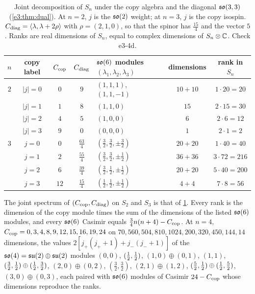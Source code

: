 \begin{table}[t]
\centering
\footnotesize
\begin{tabular}{@{}cccclcc@{}}
\toprule
$n$ & copy label & $C_{\rm cop}$ & $C_{\rm diag}$ & $\mathfrak{so}(6)$ modules $(\lambda_1,\lambda_2,\lambda_3)$ & dimensions & rank in $S_n$\\
\midrule
$2$ & $|j|=0$ & $0$ & $9$ & $(1,1,1)$, $(1,1,-1)$ & $10+10$ & $1\cdot20=20$\\
 & $|j|=1$ & $1$ & $8$ & $(1,1,0)$ & $15$ & $2\cdot15=30$\\
 & $|j|=2$ & $4$ & $5$ & $(1,0,0)$ & $6$ & $2\cdot6=12$\\
 & $|j|=3$ & $9$ & $0$ & $(0,0,0)$ & $1$ & $2\cdot1=2$\\
\midrule
$3$ & $j=0$ & $0$ & $\tfrac{63}4$ & $(\tfrac32,\tfrac32,\pm\tfrac32)$ & $20+20$ & $1\cdot40=40$\\
 & $j=1$ & $2$ & $\tfrac{55}4$ & $(\tfrac32,\tfrac32,\pm\tfrac12)$ & $36+36$ & $3\cdot72=216$\\
 & $j=2$ & $6$ & $\tfrac{39}4$ & $(\tfrac32,\tfrac12,\pm\tfrac12)$ & $20+20$ & $5\cdot40=200$\\
 & $j=3$ & $12$ & $\tfrac{15}4$ & $(\tfrac12,\tfrac12,\pm\tfrac12)$ & $4+4$ & $7\cdot8=56$\\
\bottomrule
\end{tabular}
\caption{Joint decomposition of $S_n$ under the copy algebra and the diagonal $\mathfrak{so}(3,3)$ (\cref{e3:thm:dual}). At $n=2$, $j$ is the
$\mathfrak{so}(2)$ weight; at $n=3$, $j$ is the copy isospin. $C_{\rm diag}=\langle\lambda,\lambda+2\rho\rangle$ with $\rho=(2,1,0)$, so that the spinor has
$\tfrac{15}4$ and the vector $5$. Ranks are real dimensions of $S_n$, equal to complex dimensions of $S_n\otimes\mathbb{C}$. Check e3-4d.}
\label{e3:tab:joint}
\end{table}

\begin{proposition}
\label{e3:prop:joint}
The joint spectrum of $(C_{\rm cop},C_{\rm diag})$ on $S_2$ and $S_3$ is that of \cref{e3:tab:joint}. Every rank is the dimension of the copy module
times the sum of the dimensions of the listed $\mathfrak{so}(6)$ modules, and every $\mathfrak{so}(6)$ Casimir equals $\tfrac34n(n+4)-C_{\rm cop}$. At $n=4$,
$C_{\rm cop}=0,3,4,8,9,12,15,16,19,24$ on $70,560,504,810,1024,200,320,450,144,14$ dimensions, the values $2[j_+(j_++1)+j_-(j_-+1)]$ of the
$\mathfrak{so}(4)=\mathfrak{su}(2)\oplus\mathfrak{su}(2)$ modules $(0,0)$, $(\tfrac12,\tfrac12)$, $(1,0)\oplus(0,1)$, $(1,1)$, $(\tfrac32,\tfrac12)\oplus(\tfrac12,\tfrac32)$, $(2,0)\oplus(0,2)$, $(\tfrac32,\tfrac32)$,
$(2,1)\oplus(1,2)$, $(\tfrac52,\tfrac12)\oplus(\tfrac12,\tfrac52)$, $(3,0)\oplus(0,3)$, each paired with $\mathfrak{so}(6)$ modules of Casimir $24-C_{\rm cop}$ whose
dimensions reproduce the ranks.
\end{proposition}


